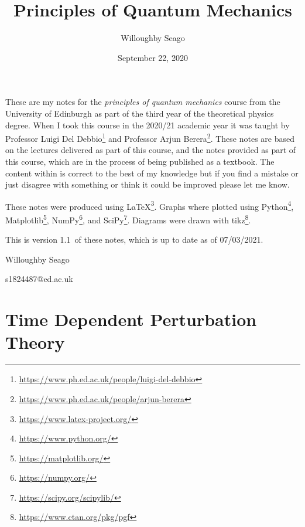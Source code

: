 \documentclass[a4paper]{article}
\author{Willoughby Seago}
\date{September 22, 2020}
\title{Principles of Quantum Mechanics}
\newcommand{\notesVersion}{1.1}
\newcommand{\notesDate}{07/03/2021}
\begin{document}
    \maketitle
    These are my notes for the \textit{principles of quantum mechanics} course from the University of Edinburgh as part of the third year of the theoretical physics degree.
    When I took this course in the 2020/21 academic year it was taught by Professor Luigi Del Debbio\footnote{\url{https://www.ph.ed.ac.uk/people/luigi-del-debbio}} and Professor Arjun Berera\footnote{\url{https://www.ph.ed.ac.uk/people/arjun-berera}}.
    These notes are based on the lectures delivered as part of this course, and the notes provided as part of this course, which are in the process of being published as a textbook.
    The content within is correct to the best of my knowledge but if you find a mistake or just disagree with something or think it could be improved please let me know.
    
    These notes were produced using \LaTeX\footnote{\url{https://www.latex-project.org/}}.
    Graphs where plotted using Python\footnote{\url{https://www.python.org/}}, Matplotlib\footnote{\url{https://matplotlib.org/}}, NumPy\footnote{\url{https://numpy.org/}}, and SciPy\footnote{\url{https://scipy.org/scipylib/}}.
    Diagrams were drawn with tikz\footnote{\url{https://www.ctan.org/pkg/pgf}}.
    
    This is version \notesVersion~of these notes, which is up to date as of \notesDate.
    \begin{flushright}
        Willoughby Seago
        
        s1824487@ed.ac.uk
    \end{flushright}
    \clearpage
    \tableofcontents
    \listoffigures
    \listoftables
    \printglossary[type=\acronymtype, title=Acronyms, style=long]
    \clearpage
    \begingroup
    \let\clearpage\relax  %
    
    
    
    
    
    
    
    \endgroup
    
    \part{Time Dependent Perturbation Theory}
\end{document}
